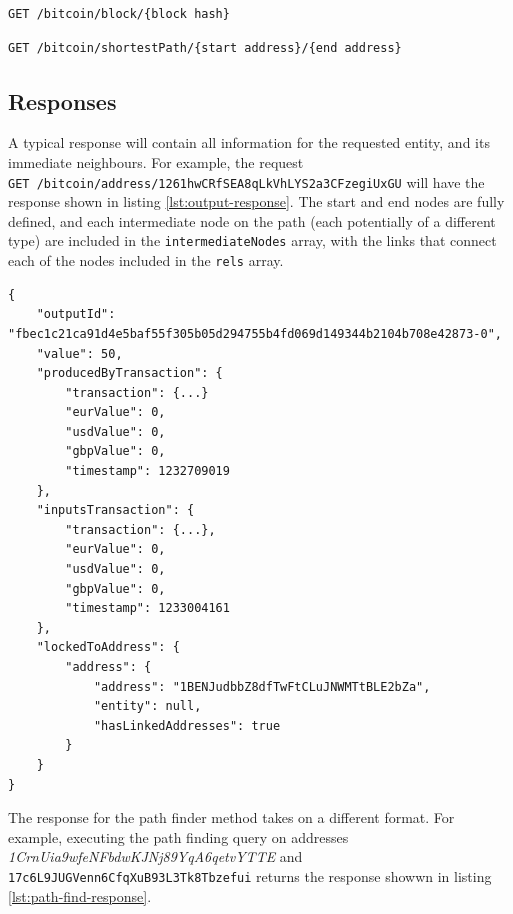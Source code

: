 \begin{lstlisting}[caption={Get a block with a unique block hash}, breaklines=true, basicstyle=\small]
GET /bitcoin/block/{block hash}
\end{lstlisting}

\begin{lstlisting}[caption={Find a path between two addresses using their full address strings}, breaklines=true, basicstyle=\small]
GET /bitcoin/shortestPath/{start address}/{end address}
\end{lstlisting}

\subsection{Responses}
A typical response will contain all information for the requested entity, and its immediate neighbours. For example, the request \\\texttt{GET /bitcoin/address/1261hwCRfSEA8qLkVhLYS2a3CFzegiUxGU} will have the response shown in listing \ref{lst:output-response}. The start and end nodes are fully defined, and each intermediate node on the path (each potentially of a different type) are included in the \texttt{intermediateNodes} array, with the links that connect each of the nodes included in the \texttt{rels} array. 

\begin{lstlisting}[label={lst:output-response}, caption={GET Output Example Response}, breaklines=true, basicstyle=\small]
{
    "outputId": "fbec1c21ca91d4e5baf55f305b05d294755b4fd069d149344b2104b708e42873-0",
    "value": 50,
    "producedByTransaction": {
        "transaction": {...}
        "eurValue": 0,
        "usdValue": 0,
        "gbpValue": 0,
        "timestamp": 1232709019
    },
    "inputsTransaction": {
        "transaction": {...},
        "eurValue": 0,
        "usdValue": 0,
        "gbpValue": 0,
        "timestamp": 1233004161
    },
    "lockedToAddress": {
        "address": {
            "address": "1BENJudbbZ8dfTwFtCLuJNWMTtBLE2bZa",
            "entity": null,
            "hasLinkedAddresses": true
        }
    }
}
\end{lstlisting}

The response for the path finder method takes on a different format. For example, executing the path finding query on addresses \textit{1CrnUia9wfeNFbdwKJNj89YqA6qetvYTTE} and \texttt{17c6L9JUGVenn6CfqXuB93L3Tk8Tbzefui} returns the response showwn in listing \ref{lst:path-find-response}.

